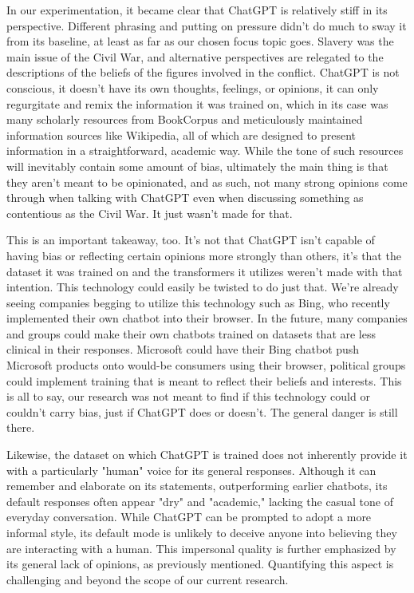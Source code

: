\documentclass[letterpaper, 10pt, conference]{ieeeconf}
\begin{document}
    In our experimentation, it became clear that ChatGPT is relatively stiff in its perspective. Different phrasing and putting on pressure didn’t do much to sway it from its baseline, at least as far as our chosen focus topic goes. Slavery was the main issue of the Civil War, and alternative perspectives are relegated to the descriptions of the beliefs of the figures involved in the conflict. ChatGPT is not conscious, it doesn’t have its own thoughts, feelings, or opinions, it can only regurgitate and remix the information it was trained on, which in its case was many scholarly resources from BookCorpus and meticulously maintained information sources like Wikipedia, all of which are designed to present information in a straightforward, academic way. While the tone of such resources will inevitably contain some amount of bias, ultimately the main thing is that they aren’t meant to be opinionated, and as such, not many strong opinions come through when talking with ChatGPT even when discussing something as contentious as the Civil War. It just wasn’t made for that.

    This is an important takeaway, too. It’s not that ChatGPT isn’t capable of having bias or reflecting certain opinions more strongly than others, it’s that the dataset it was trained on and the transformers it utilizes weren’t made with that intention. This technology could easily be twisted to do just that. We’re already seeing companies begging to utilize this technology such as Bing, who recently implemented their own chatbot into their browser. In the future, many companies and groups could make their own chatbots trained on datasets that are less clinical in their responses. Microsoft could have their Bing chatbot push Microsoft products onto would-be consumers using their browser, political groups could implement training that is meant to reflect their beliefs and interests. This is all to say, our research was not meant to find if this technology could or couldn’t carry bias, just if ChatGPT does or doesn’t. The general danger is still there.

    Likewise, the dataset on which ChatGPT is trained does not inherently provide it with a particularly "human" voice for its general responses. Although it can remember and elaborate on its statements, outperforming earlier chatbots, its default responses often appear "dry" and "academic," lacking the casual tone of everyday conversation. While ChatGPT can be prompted to adopt a more informal style, its default mode is unlikely to deceive anyone into believing they are interacting with a human. This impersonal quality is further emphasized by its general lack of opinions, as previously mentioned. Quantifying this aspect is challenging and beyond the scope of our current research.
\end{document}
